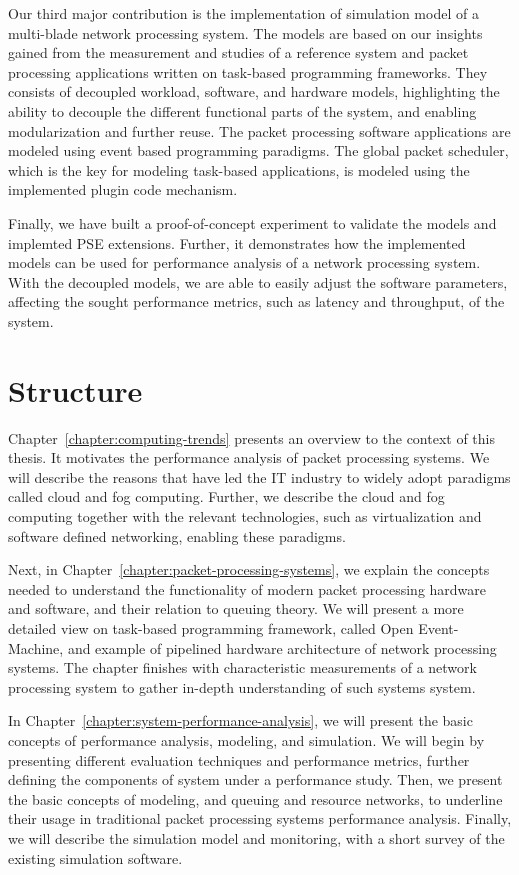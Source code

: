 Our third major contribution is the implementation of simulation model of a multi-blade network processing system. The models are based on our insights gained from the measurement and studies of a reference system and packet processing applications written on task-based programming frameworks. They consists of decoupled workload, software, and hardware models, highlighting the ability to decouple the different functional parts of the system, and enabling modularization and further reuse. The packet processing software applications are modeled using event based programming paradigms. The global packet scheduler, which is the key for modeling task-based applications, is modeled using the implemented plugin code mechanism.

Finally, we have built a proof-of-concept experiment to validate the models and implemted PSE extensions. Further, it demonstrates how the implemented models can be used for performance analysis of a network processing system. With the decoupled models, we are able to easily adjust the software parameters, affecting the sought performance metrics, such as latency and throughput, of the system.

\section{Structure}
Chapter~\ref{chapter:computing-trends} presents an overview to the context of this thesis. It motivates the performance analysis of packet processing systems. We will describe the reasons that have led the IT industry to widely adopt paradigms called cloud and fog computing. Further, we describe the cloud and fog computing together with the relevant technologies, such as virtualization and software defined networking, enabling these paradigms.

Next, in Chapter~\ref{chapter:packet-processing-systems}, we explain the concepts needed to understand the functionality of modern packet processing hardware and software, and their relation to queuing theory. We will present a more detailed view on task-based programming framework, called Open Event-Machine, and example of pipelined hardware architecture of network processing systems. The chapter finishes with characteristic measurements of a network processing system to gather in-depth understanding of such systems system.

In Chapter~\ref{chapter:system-performance-analysis}, we will present the basic concepts of performance analysis, modeling, and simulation. We will begin by presenting different evaluation techniques and performance metrics, further defining the components of system under a performance study. Then, we present the basic concepts of modeling, and queuing and resource networks, to underline their usage in traditional packet processing systems performance analysis. Finally, we will describe the simulation model and monitoring, with a short survey of the existing simulation software.

